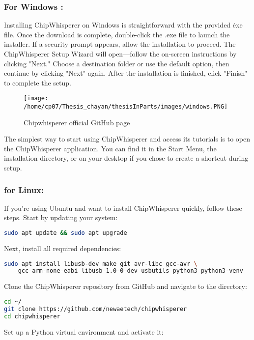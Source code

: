 \subsubsection{For Windows :}
Installing ChipWhisperer on Windows is straightforward with the provided \.exe file. Once the download is complete, double-click the .exe file to launch the installer. If a security prompt appears, allow the installation to proceed. The ChipWhisperer Setup Wizard will open—follow the on-screen instructions by clicking "Next." Choose a destination folder or use the default option, then continue by clicking "Next" again. After the installation is finished, click "Finish" to complete the setup.
\begin{figure}[h]
    \centering
    \texttt{[image: /home/cp07/Thesis\_chayan/thesisInParts/images/windows.PNG]}
    \caption{Chipwhisperer official GitHub page}
    \label{fig:windows_installation}
\end{figure}
The simplest way to start using ChipWhisperer and access its tutorials is to open the ChipWhisperer application. You can find it in the Start Menu, the installation directory, or on your desktop if you chose to create a shortcut during setup.

\subsubsection{for Linux:}
If you're using Ubuntu and want to install ChipWhisperer quickly, follow these steps. Start by updating your system:

\begin{lstlisting}[language=bash]
sudo apt update && sudo apt upgrade
\end{lstlisting}

Next, install all required dependencies:

\begin{lstlisting}[language=bash]
sudo apt install libusb-dev make git avr-libc gcc-avr \
    gcc-arm-none-eabi libusb-1.0-0-dev usbutils python3 python3-venv
\end{lstlisting}

Clone the ChipWhisperer repository from GitHub and navigate to the directory:

\begin{lstlisting}[language=bash]
cd ~/
git clone https://github.com/newaetech/chipwhisperer
cd chipwhisperer
\end{lstlisting}

Set up a Python virtual environment and activate it:

